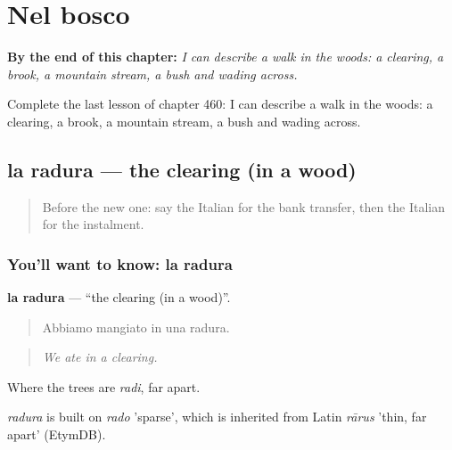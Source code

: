 
\chapter{Nel bosco}
\label{ch:it-nel-bosco}

\begin{chapteropening}
\textbf{By the end of this chapter:} \emph{I can describe a walk in the woods: a clearing, a brook, a mountain stream, a bush and wading across.}

Complete the last lesson of chapter 460: I can describe a walk in the woods: a clearing, a brook, a mountain stream, a bush and wading across.
\end{chapteropening}

\section[la radura]{la radura — the clearing (in a wood)}

\label{lesson:IT-C460-radura}



\begin{quote}
Before the new one: say the Italian for the bank transfer, then the Italian for the instalment.
\end{quote}

\subsection*{You'll want to know: la radura}
\textbf{la radura} — \textquotedblleft{}the clearing (in a wood)\textquotedblright{}.

\begin{quote}
Abbiamo mangiato in una radura.
\end{quote}

\begin{quote}
\emph{We ate in a clearing.}
\end{quote}

Where the trees are \emph{radi}, far apart.

\begin{cousinweb}
\emph{radura} is built on \emph{rado} 'sparse', which is inherited from Latin \emph{rārus} 'thin, far apart' (EtymDB).
\end{cousinweb}

